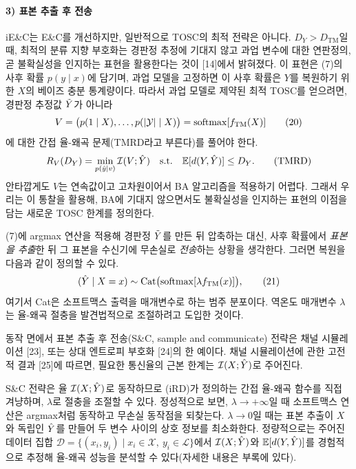 \paragraph{3) 표본 추출 후 전송}
iE\&C는 E\&C를 개선하지만, 일반적으로 TOSC의 최적 전략은 아니다. $D_Y>D_{\mathrm{TM}}$일 때, 최적의 분류 지향 부호화는 경판정 추정에 기대지 않고 과업 변수에 대한 연판정의, 곧 불확실성을 인지하는 표현을 활용한다는 것이 [14]에서 밝혀졌다. 이 표현은 (7)의 사후 확률 $p(y\mid x)$에 담기며, 과업 모델을 고정하면 이 사후 확률은 $Y$를 복원하기 위한 $X$의 베이즈 충분 통계량이다. 따라서 과업 모델로 제약된 최적 TOSC를 얻으려면, 경판정 추정값 $\tilde{Y}$가 아니라
\begin{equation}
V=\bigl(p(1\mid X),\dots,p(|\mathcal{Y}|\mid X)\bigr)=\mathrm{softmax}[f_{\mathrm{TM}}(X)]\tag{20}
\end{equation}
에 대한 간접 율-왜곡 문제(TMRD라고 부른다)를 풀어야 한다.
\begin{equation}
R_V(D_Y)=\min_{p(\hat y|v)}\mathcal{I}(V;\hat{Y})\quad\text{s.t.}\quad\mathbb{E}[d(Y,\hat{Y})]\le D_Y.\tag{TMRD}
\end{equation}
안타깝게도 $V$는 연속값이고 고차원이어서 BA 알고리즘을 적용하기 어렵다. 그래서 우리는 이 통찰을 활용해, BA에 기대지 않으면서도 불확실성을 인지하는 표현의 이점을 담는 새로운 TOSC 한계를 정의한다.

(7)에 argmax 연산을 적용해 경판정 $\tilde{Y}$를 만든 뒤 압축하는 대신,
사후 확률에서 \emph{표본을 추출}한 뒤 그 표본을 수신기에 무손실로 \emph{전송}하는 상황을 생각한다. 그러면 복원을 다음과 같이 정의할 수 있다.
\begin{equation}
(\hat{Y}\mid X=x)\sim\mathrm{Cat}\bigl(\mathrm{softmax}[\lambda f_{\mathrm{TM}}(x)]\bigr),\tag{21}
\end{equation}
여기서 Cat은 소프트맥스 출력을 매개변수로 하는 범주 분포이다. 역온도 매개변수 $\lambda$는 율-왜곡 절충을 발견법적으로 조절하려고 도입한 것이다.

동작 면에서 표본 추출 후 전송(S\&C, sample and communicate) 전략은 채널 시뮬레이션 [23], 또는 상대 엔트로피 부호화 [24]의 한 예이다. 채널 시뮬레이션에 관한 고전적 결과 [25]에 따르면, 필요한 통신율의 근본 한계는 $\mathcal{I}(X;\hat{Y})$로 주어진다.

S\&C 전략은 율 $\mathcal{I}(X;\hat{Y})$로 동작하므로 (iRD)가 정의하는 간접 율-왜곡 함수를 직접 겨냥하며, $\lambda$로 절충을 조절할 수 있다. 정성적으로 보면, $\lambda\to+\infty$일 때 소프트맥스 연산은 argmax처럼 동작하고 무손실 동작점을 되찾는다. $\lambda\to0$일 때는 표본 추출이 $X$와 독립인 $\hat{Y}$를 만들어 두 변수 사이의 상호 정보를 최소화한다. 정량적으로는 주어진 데이터 집합 $\mathcal D=\{(x_i,y_i)\mid x_i\in\mathcal X,\ y_i\in\mathcal L\}$에서 $\mathcal{I}(X;\hat{Y})$와 $\mathbb{E}[d(Y,\hat{Y})]$를 경험적으로 추정해 율-왜곡 성능을 분석할 수 있다(자세한 내용은 부록에 있다).


